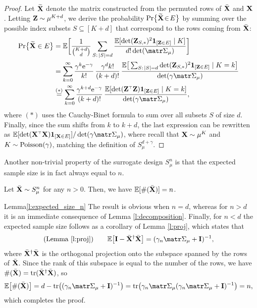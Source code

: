\documentclass[../../thesis.tex]{subfiles}
\begin{document}
\begin{proof}
  Let $\widetilde{\mathbf{X}}$ denote the matrix constructed from the permuted rows of
  ${\bar{\mathbf X}}$ and $\mathbf X$.  Letting $\mathbf Z\sim\mu^{K+d}$, we derive the probability
  $\mathrm{Pr}\big\{\widetilde{\mathbf{X}}\!\in\! E\big\}$ by summing over the possible index subsets  $S\subseteq
    [K+d]$ that correspond to the rows coming from ${\bar{\mathbf X}}$:
  \begin{align*}
    \Pr\big\{\Xt\in E\big\} & = \E\bigg[\frac{1}{\binom{K+d}{d}}
      \sum_{S:\,|S|=d}\frac{\E[\det(\Z_{S,*})^2\one_{[\Z\in E]}\mid
    K]}{d!\det(\Sigmab_\mu)}\bigg]                               \\
                            & =\sum_{k=0}^\infty
    \frac{\gamma^k\ee^{-\gamma}}{k!}\,\frac{\gamma^dk!}{(k+d)!}\,
    \frac{\E\big[\sum_{S:\,|S|=d}\det(\Z_{S,*})^2\one_{[\Z\in E]}\mid
    K=k\big]}{\det(\gamma\Sigmab_\mu)}                           \\
                            & \overset{(*)}{=} \sum_{k=0}^\infty
    \frac{\gamma^{k+d}\ee^{-\gamma}}{(k+d)!}
    \,\frac{\E[\det(\Z^\top\Z)\one_{[\Z\in E]}\mid K=k]}{\det(\gamma\Sigmab_\mu)},
  \end{align*}
  where $(*)$ uses the Cauchy-Binet formula to sum over all subsets $S$
  of size $d$. Finally, since the sum shifts from $k$
  to $k+d$, the last expression can be rewritten as
  $\E[\det(\X^\top\X)\one_{[\X\in E]}]/\det(\gamma\Sigmab_\mu)$, where recall that
  $\mathbf X\sim\mu^K$ and $K\sim{\operatorname{Poisson}}(\gamma)$, matching the definition of $S_\mu^{d+\gamma}$.
\end{proof}

Another non-trivial property of the surrogate design $S_\mu^n$ is
that the expected sample size is in fact always equal to $n$.
\begin{lemma} \label{l:expected_size_n}
  Let ${\bar{\mathbf X}}\sim S_\mu^n$ for any $n>0$.
  Then, we have $\mathbb E[\#({\bar{\mathbf X}})] = n$.
\end{lemma}

\begin{proofof}{Lemma}{\ref{l:expected_size_n}}
  The result is obvious when $n=d$, whereas
  for $n>d$ it is an immediate consequence
  of Lemma \ref{l:decomposition}.
  Finally, for $n<d$ the expected sample
  size follows as a corollary of Lemma \ref{l:proj}, which states that
  \begin{align*}
    \text{(Lemma \ref{l:proj})} \qquad\E\big[\I - \Xb^\dagger\Xb\big] =
    (\gamma_n\Sigmab_\mu + \I)^{-1},
  \end{align*}
  where ${\bar{\mathbf X}}^\dagger{\bar{\mathbf X}}$ is the orthogonal projection onto
  the subspace spanned by the rows of ${\bar{\mathbf X}}$. Since the rank of this
  subspace is equal to the number of the rows, we have
  $\#({\bar{\mathbf X}})=\mathrm{tr}({\bar{\mathbf X}}^\dagger{\bar{\mathbf X}})$, so
  \begin{align*}
    \E\big[\#(\Xb)\big] = d - \tr\big((\gamma_n\Sigmab_\mu +
    \I)^{-1}\big) =
    \tr\big(\gamma_n\Sigmab_\mu(\gamma_n\Sigmab_\mu+\I)^{-1}\big) = n,
  \end{align*}
  which completes the proof.
\end{proofof}
\end{document}
